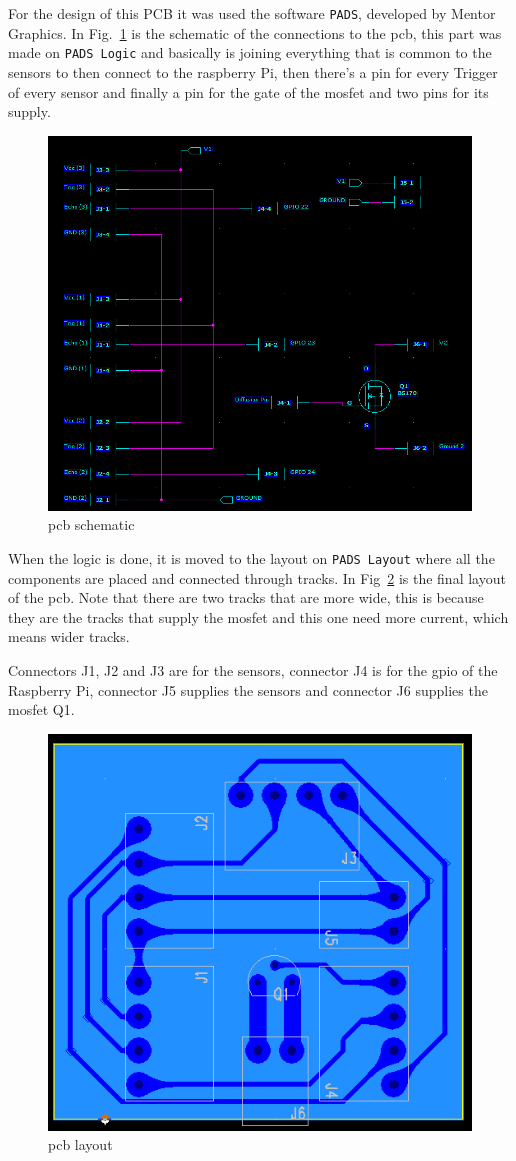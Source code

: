 For the design of this PCB it was used the software \texttt{PADS}, developed by Mentor Graphics.
In Fig.~\ref{fig:pcb-schematic} is the schematic of the connections to the \gls{pcb}, this part was made on \texttt{PADS Logic} and basically is joining everything that is common to the sensors to then connect to the raspberry Pi, then there's a pin for every Trigger of every sensor and finally a pin for the gate of the \gls{mosfet} and two pins for its supply.
%
\begin{figure}[htb!]
\centering
    \includegraphics[width=0.7\columnwidth]{./img/pcb-logic.png}
  \caption{\gls{pcb} schematic}%
\label{fig:pcb-schematic}
\end{figure}

When the logic is done, it is moved to the layout on \texttt{PADS Layout} where all the components are placed and connected through tracks. In Fig~\ref{fig:pcb-layout} is the final layout of the \gls{pcb}. Note that there are two tracks that are more wide, this is because they are the tracks that supply the \gls{mosfet} and this one need more current, which means wider tracks.

Connectors J1, J2 and J3 are for the sensors, connector J4 is for the \gls{gpio} of the Raspberry Pi, connector J5 supplies the sensors and connector J6 supplies the \gls{mosfet} Q1.
%
\begin{figure}[htb!]
\centering
    \includegraphics[width=0.6\columnwidth]{./img/pcb-layout.png}
  \caption{\gls{pcb} layout}%
\label{fig:pcb-layout}
\end{figure}

